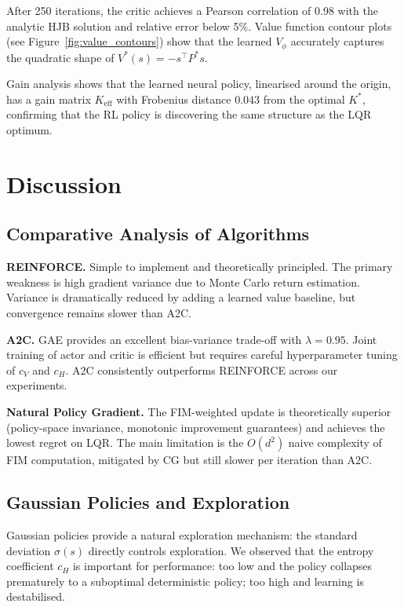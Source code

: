 \documentclass[11pt, a4paper]{article}
\newcommand{\T}{\top}
\begin{document}
After 250 iterations, the critic achieves a Pearson correlation of 0.98 with the
analytic HJB solution and relative error below 5\%.
Value function contour plots (see Figure~\ref{fig:value_contours}) show that the
learned $V_\phi$ accurately captures the quadratic shape of $V^*(s) = -s^\T P^* s$.

Gain analysis shows that the learned neural policy, linearised around the origin,
has a gain matrix $K_{\text{eff}}$ with Frobenius distance $0.043$ from the optimal
$K^*$, confirming that the RL policy is discovering the same structure as the LQR
optimum.

\section{Discussion}
\label{sec:discussion}

\subsection{Comparative Analysis of Algorithms}

\textbf{REINFORCE.}
Simple to implement and theoretically principled.
The primary weakness is high gradient variance due to Monte Carlo return estimation.
Variance is dramatically reduced by adding a learned value baseline,
but convergence remains slower than A2C.

\textbf{A2C.}
GAE provides an excellent bias-variance trade-off with $\lambda = 0.95$.
Joint training of actor and critic is efficient but requires careful hyperparameter
tuning of $c_V$ and $c_H$. A2C consistently outperforms REINFORCE across our
experiments.

\textbf{Natural Policy Gradient.}
The FIM-weighted update is theoretically superior (policy-space invariance,
monotonic improvement guarantees) and achieves the lowest regret on LQR.
The main limitation is the $O(d^2)$ naive complexity of FIM computation,
mitigated by CG but still slower per iteration than A2C.

\subsection{Gaussian Policies and Exploration}

Gaussian policies provide a natural exploration mechanism: the standard deviation
$\sigma(s)$ directly controls exploration.
We observed that the entropy coefficient $c_H$ is important for performance:
too low and the policy collapses prematurely to a suboptimal deterministic policy;
too high and learning is destabilised.
\end{document}
